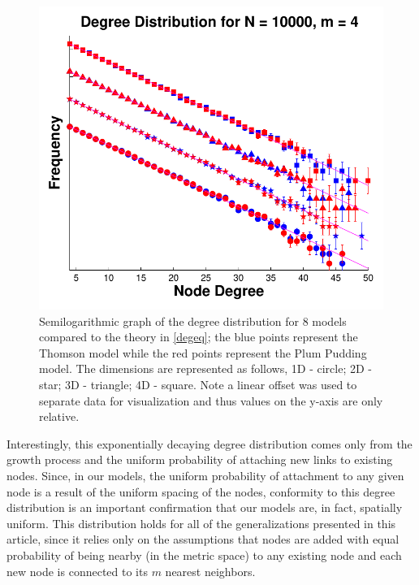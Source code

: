 \documentclass[aps,pre,reprint,superscriptaddress,amsmath,amssymb,nofootinbib]{revtex4-1}
\begin{document}
\begin{figure}
\includegraphics[width=\linewidth]{figures/fig11.pdf}
\caption{\label{degdist}Semilogarithmic graph of the degree distribution for 8 models compared to the theory in \eqref{degeq}; the blue points represent the Thomson model while the red points represent the Plum Pudding model. The dimensions are represented as follows, 1D - circle; 2D - star; 3D - triangle; 4D - square. Note a linear offset was used to separate data for visualization and thus values on the y-axis are only relative.}
\end{figure}
Interestingly, this exponentially decaying degree distribution comes only from the growth process and the uniform probability of attaching new links to existing nodes.  
Since, in our models, the uniform probability of attachment to any given node is a result of the uniform spacing of the nodes, conformity to this degree distribution is an important confirmation that our models are, in fact, spatially uniform.
This distribution holds for all of the generalizations presented in this article, since it relies only on the assumptions that nodes are added with equal probability of being nearby (in the metric space) to any existing node and each new node is connected to its $m$ nearest neighbors.
\end{document}
